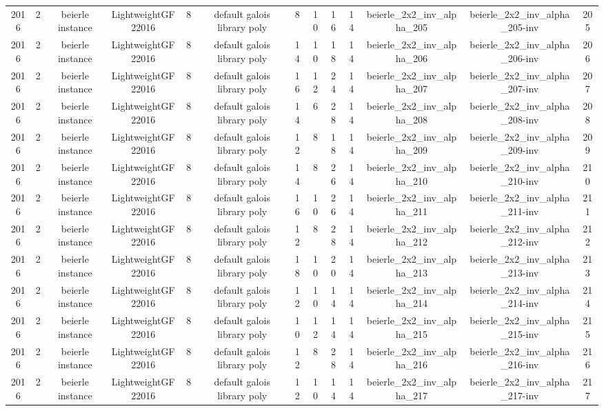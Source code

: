 \begin{tabular}{c c c c c c c c c c c c c}
2016 & 2 & beierle instance & LightweightGF22016 & 8 & default galois library poly & 8 & 10 & 16 & 14 & beierle_2x2_inv_alpha_205 & beierle_2x2_inv_alpha_205-inv & 205 \\
2016 & 2 & beierle instance & LightweightGF22016 & 8 & default galois library poly & 14 & 10 & 18 & 14 & beierle_2x2_inv_alpha_206 & beierle_2x2_inv_alpha_206-inv & 206 \\
2016 & 2 & beierle instance & LightweightGF22016 & 8 & default galois library poly & 16 & 12 & 24 & 14 & beierle_2x2_inv_alpha_207 & beierle_2x2_inv_alpha_207-inv & 207 \\
2016 & 2 & beierle instance & LightweightGF22016 & 8 & default galois library poly & 14 & 6 & 28 & 14 & beierle_2x2_inv_alpha_208 & beierle_2x2_inv_alpha_208-inv & 208 \\
2016 & 2 & beierle instance & LightweightGF22016 & 8 & default galois library poly & 12 & 8 & 18 & 14 & beierle_2x2_inv_alpha_209 & beierle_2x2_inv_alpha_209-inv & 209 \\
2016 & 2 & beierle instance & LightweightGF22016 & 8 & default galois library poly & 14 & 8 & 26 & 14 & beierle_2x2_inv_alpha_210 & beierle_2x2_inv_alpha_210-inv & 210 \\
2016 & 2 & beierle instance & LightweightGF22016 & 8 & default galois library poly & 16 & 10 & 26 & 14 & beierle_2x2_inv_alpha_211 & beierle_2x2_inv_alpha_211-inv & 211 \\
2016 & 2 & beierle instance & LightweightGF22016 & 8 & default galois library poly & 12 & 8 & 28 & 14 & beierle_2x2_inv_alpha_212 & beierle_2x2_inv_alpha_212-inv & 212 \\
2016 & 2 & beierle instance & LightweightGF22016 & 8 & default galois library poly & 18 & 10 & 20 & 14 & beierle_2x2_inv_alpha_213 & beierle_2x2_inv_alpha_213-inv & 213 \\
2016 & 2 & beierle instance & LightweightGF22016 & 8 & default galois library poly & 12 & 10 & 14 & 14 & beierle_2x2_inv_alpha_214 & beierle_2x2_inv_alpha_214-inv & 214 \\
2016 & 2 & beierle instance & LightweightGF22016 & 8 & default galois library poly & 10 & 12 & 14 & 14 & beierle_2x2_inv_alpha_215 & beierle_2x2_inv_alpha_215-inv & 215 \\
2016 & 2 & beierle instance & LightweightGF22016 & 8 & default galois library poly & 12 & 8 & 28 & 14 & beierle_2x2_inv_alpha_216 & beierle_2x2_inv_alpha_216-inv & 216 \\
2016 & 2 & beierle instance & LightweightGF22016 & 8 & default galois library poly & 12 & 10 & 14 & 14 & beierle_2x2_inv_alpha_217 & beierle_2x2_inv_alpha_217-inv & 217 \\

\end{tabular}

